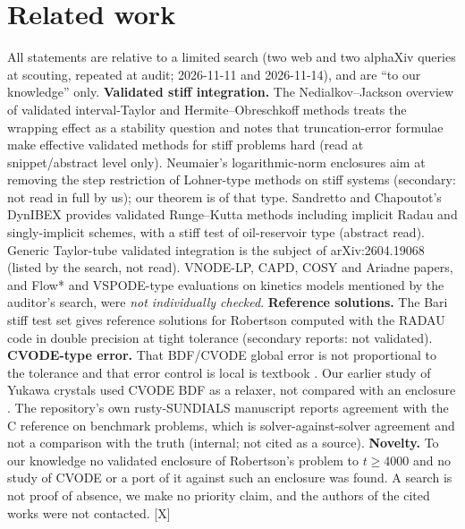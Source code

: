 \documentclass[11pt]{article}
\newcommand{\tier}[1]{\textsf{[#1]}}
\newcommand{\tX}{\tier{X}}
\theoremstyle{remark}
\begin{document}
\section{Related work}\label{sec:related}
All statements are relative to a limited search (two web and two alphaXiv queries at scouting, repeated at audit; 2026-11-11 and 2026-11-14), and are ``to our knowledge'' only.
\textbf{Validated stiff integration.} The Nedialkov--Jackson overview of validated interval-Taylor and Hermite--Obreschkoff methods treats the wrapping effect as a stability question and notes that truncation-error formulae make effective validated methods for stiff problems hard \cite{nj} (read at snippet/abstract level only). Neumaier's logarithmic-norm enclosures \cite{neu} aim at removing the step restriction of Lohner-type methods on stiff systems (secondary: not read in full by us); our theorem is of that type. Sandretto and Chapoutot's DynIBEX provides validated Runge--Kutta methods including implicit Radau and singly-implicit schemes, with a stiff test of oil-reservoir type \cite{dynibex} (abstract read). Generic Taylor-tube validated integration is the subject of arXiv:2604.19068 \cite{tube} (listed by the search, not read). VNODE-LP, CAPD, COSY and Ariadne papers, and Flow* and VSPODE-type evaluations on kinetics models mentioned by the auditor's search, were \emph{not individually checked}.
\textbf{Reference solutions.} The Bari stiff test set \cite{bari} gives reference solutions for Robertson computed with the RADAU code in double precision at tight tolerance (secondary reports: not validated).
\textbf{CVODE-type error.} That BDF/CVODE global error is not proportional to the tolerance and that error control is local is textbook \cite{hw,sundialsdocs}. Our earlier study of Yukawa crystals used CVODE BDF as a relaxer, not compared with an enclosure \cite{yukawa}. The repository's own rusty-SUNDIALS manuscript reports agreement with the C reference on benchmark problems, which is solver-against-solver agreement and not a comparison with the truth (internal; not cited as a source).
\textbf{Novelty.} To our knowledge no validated enclosure of Robertson's problem to $t\ge4000$ and no study of CVODE or a port of it against such an enclosure was found. A search is not proof of absence, we make no priority claim, and the authors of the cited works were not contacted. \tX{}

\end{document}
